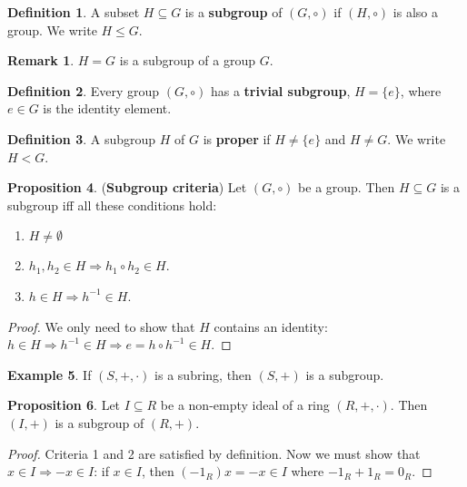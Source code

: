 \documentclass[12pt,a4paper]{article}
\theoremstyle{definition}
\newtheorem{definition}{Definition}[subsection]
\newtheorem{proposition}[definition]{Proposition}
\newtheorem{example}[definition]{Example}
\newtheorem*{remark}{Remark}
\begin{document}
\begin{definition}
	A subset $H \subseteq G$ is a \textbf{subgroup} of $(G, \circ)$ if $(H, \circ)$ is also a group. We write $H \le G$.
\end{definition}

\begin{remark}
	$H = G$ is a subgroup of a group $G$.
\end{remark}

\begin{definition}
	Every group $(G, \circ)$ has a \textbf{trivial subgroup}, $H = \{ e \}$, where $e \in G$ is the identity element.
\end{definition}

\begin{definition}
	A subgroup $H$ of $G$ is \textbf{proper} if $H \ne \{ e \}$ and $H \ne G$. We write $H < G$.
\end{definition}

\begin{proposition}
	(\textbf{Subgroup criteria}) Let $(G, \circ)$ be a group. Then $H \subseteq G$ is a subgroup iff all these conditions hold:
	\begin{enumerate}
		\item $H \ne \emptyset$
		\item $h_1, h_2 \in H \Rightarrow h_1 \circ h_2 \in H$.
		\item $h \in H \Rightarrow h^{-1} \in H$.
	\end{enumerate}
\end{proposition}

\begin{proof}
	We only need to show that $H$ contains an identity: $h \in H \Rightarrow h^{-1} \in H \Rightarrow e = h \circ h^{-1} \in H$.
\end{proof}

\begin{example}
	If $(S, +, \cdot)$ is a subring, then $(S, +)$ is a subgroup.
\end{example}

\begin{proposition}
	Let $I \subseteq R$ be a non-empty ideal of a ring $(R, +, \cdot)$. Then $(I, +)$ is a subgroup of $(R, +)$.
\end{proposition}

\begin{proof}
	Criteria 1 and 2 are satisfied by definition. Now we must show that $x \in I \Rightarrow -x \in I$: if $x \in I$, then $(-1_R) x = -x \in I$ where $-1_R + 1_R = 0_R$.
\end{proof}
\end{document}
